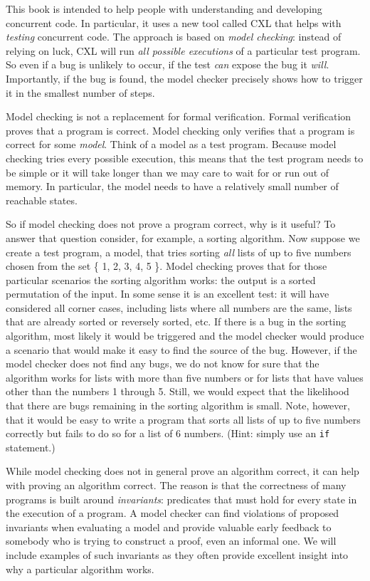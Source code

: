 \documentclass{report}
\begin{document}
This book is intended to help people with understanding and
developing concurrent code.  In particular, it uses a new tool
called CXL that helps with \emph{testing} concurrent code.
The approach is based on \emph{model checking}:
instead of relying
on luck, CXL will run \emph{all possible executions} of a particular
test program.  So even if a bug is unlikely to occur, if the test
\emph{can} expose the bug it \emph{will}.  Importantly, if the bug is
found, the model checker precisely shows how to trigger it in
the smallest number of steps.

Model checking is not a replacement for formal verification.
Formal verification proves that a program is correct.  Model checking only
verifies that a program is correct for some \emph{model}.  Think of
a model as a test program.  Because model checking tries every possible
execution, this means that the test program needs to be
simple or it will take longer than we may care to wait for or run
out of memory.
In particular, the model needs to have a relatively small number of
reachable states.

So if model checking does not prove a program correct, why is it
useful?  To answer that question consider, for example, a sorting
algorithm.
Now suppose we create a test program, a model, that tries sorting
\emph{all} lists of up to five numbers chosen from the set \{ 1,
2, 3, 4, 5 \}.  Model checking proves that for those particular
scenarios the sorting algorithm works: the output is a sorted
permutation of the input.  In some sense it is an excellent test:
it will have considered all corner cases, including lists where all
numbers are the same, lists that are already sorted or reversely
sorted, etc.  If there is a bug in the sorting algorithm, most
likely it would be triggered and the model checker would produce a
scenario that would make it easy to find the source of the bug.
However, if the model checker does not find any bugs, we do not
know for sure that the algorithm works for lists with more than
five numbers or for lists that have values other than the numbers
1 through 5.  Still, we would expect that the likelihood that there
are bugs remaining in the sorting algorithm is small.
Note, however, that it would be easy to write a program
that sorts all lists of up to five numbers correctly but fails to
do so for a list of 6 numbers.  (Hint: simply use an \texttt{if}
statement.)


While model checking does not in general prove an algorithm correct,
it can help with proving an algorithm correct.
The reason is that the correctness of many programs is built around
\emph{invariants}:
predicates that must hold for every state in the
execution of a program.  A model checker can find violations of
proposed invariants when evaluating a model and provide valuable early
feedback to somebody who is trying to construct a proof, even an
informal one.
We will include examples
of such invariants as they often provide excellent insight into
why a particular algorithm works.
\end{document}
